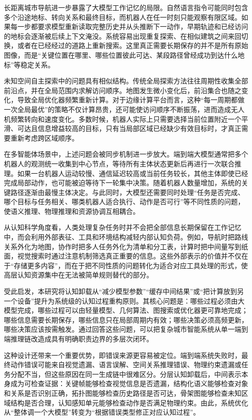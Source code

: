 长距离城市导航进一步暴露了大模型工作记忆的局限。自然语言指令可能同时包含多个沿途地标、转向关系和最终目标，而机器人在任一时刻只能观察有限区域。如果每一步都要求模型重新读取完整历史并从头推断下一动作，早期轨迹和已经访问的地标会逐渐被后续上下文淹没。系统容易出现重复探索、在相似建筑之间来回切换，或者在已经经过的道路上重新搜索。这里真正需要长期保存的并不是所有原始图像，而是“关键位置在哪里、哪些位置彼此可达、某段路径曾经成功到达什么地标”等稳定关系。

未知空间自主探索中的问题具有相似结构。传统全局探索方法往往周期性收集全部前沿点，并在全局范围内求解访问顺序。地图发生微小变化后，前沿集合也随之变化，导致全局优化器频繁重新计算。对于边缘计算平台而言，这种“每一周期都做一次全局最优”的策略不仅计算昂贵，还可能使访问顺序不断振荡，进而造成无人机频繁转向和速度变化。多数时候，机器人实际上只需要选择当前位置附近一个平滑、可达且信息增益较高的目标，只有当局部区域已经缺少有效目标时，才真正需要重新考虑跨区域顺序。

在多智能体场景中，上述问题会被同步机制进一步放大。端到端大模型通常把多个机器人的观测统一收集到中心节点，等待所有主体状态更新后再进行一次联合推理。如果一台机器人运动较慢、通信延迟较高或当前任务较长，其他主体即使已经完成局部动作，也可能被迫等待下一轮集中决策。随着机器人数量增加，系统的关键路径逐渐由最慢主体决定。与此同时，大模型还需要同时处理“任务是否完成、哪个目标与任务相关、哪类机器人适合执行、动作是否可行”等不同性质的问题，使语义推理、物理推理和资源协调互相耦合。

从认知科学角度看，人类处理复杂任务时并不会把全部信息长期保留在工作记忆中，而会利用外部表征、工具和环境结构减轻内部认知负荷。例如，导航时把路线关系外化为地图，协作时把多人任务外化为清单和分工表，计算时把中间量写到纸面，视觉搜索时通过注意机制筛选真正重要的信息。这些外部表示的价值并不仅在于“存储更多内容”，而在于把不同性质的问题转化为适合对应工具处理的形式，使高层认知资源集中在无法被简单规则替代的部分。

受此启发，本研究将认知卸载从“减少模型参数”“缓存中间结果”或“把计算放到另一个设备”提升为系统级的认知过程重构原则。其核心问题是：哪些过程必须由大模型完成，哪些过程可以由轻量模型、几何算法、图搜索或优化器更可靠地完成；哪些信息需要长期保存，哪些信息只在局部周期内有效；哪些决策必须高频更新，哪些决策应该按需触发。通过回答这些问题，可以把复杂城市智能系统从单一端到端推理链改造成具有明确职责边界的多层次闭环。

这种设计还带来一个重要优势，即错误来源更容易被定位。端到端系统失败时，最终动作错误可能来自视觉遗漏、语言误解、空间关系推理错误、物理约束遗漏或任务分配不当，但这些原因在同一生成链中很难区分。分层认知卸载后，中间表示本身成为可检查证据：关键帧能够检查视觉信息是否遗漏，结构化语义能够检查对象和关系是否识别正确，拓扑图能够检查历史路径是否可达，骨架图能够检查未知区域结构是否合理，认知感知单元能够检查动作是否满足物理约束。由此，系统优化从“整体调一个大模型”转变为“根据错误类型修正对应认知过程”。

